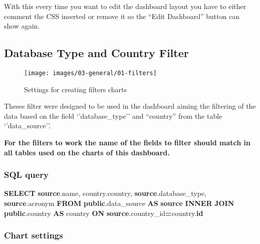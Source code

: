 \documentclass[
]{book}
\newenvironment{Shaded}{\begin{snugshade}}{\end{snugshade}}
\newcommand{\KeywordTok}[1]{\textcolor[rgb]{0.13,0.29,0.53}{\textbf{#1}}}
\newcommand{\NormalTok}[1]{#1}
\newcommand{\OperatorTok}[1]{\textcolor[rgb]{0.81,0.36,0.00}{\textbf{#1}}}
\begin{document}
With this every time you want to edit the dashboard layout you have to either comment the CSS inserted
or remove it so the ``Edit Dashboard'' button can show again.

\hypertarget{database-type-and-country-filter}{%
\subsection*{Database Type and Country Filter}\label{database-type-and-country-filter}}

\begin{figure}
\texttt{[image: images/03-general/01-filters]} \caption{Settings for creating filters charts}\label{fig:filters}
\end{figure}

Theses filter were designed to be used in the dashboard aiming the filtering of the data based on the field `'database\_type'' and ``country'' from the table `'data\_source''.

\textbf{For the filters to work the name of the fields to filter should match in all tables used on the charts of this dashboard.}

\hypertarget{sql-query}{%
\subsubsection*{SQL query}\label{sql-query}}

\begin{Shaded}
\begin{Highlighting}[]
\KeywordTok{SELECT} \KeywordTok{source}\NormalTok{.name,}
\NormalTok{       country.country,}
       \KeywordTok{source}\NormalTok{.database\_type,}
       \KeywordTok{source}\NormalTok{.acronym}
\KeywordTok{FROM} \KeywordTok{public}\NormalTok{.data\_source }\KeywordTok{AS} \KeywordTok{source}
\KeywordTok{INNER} \KeywordTok{JOIN} \KeywordTok{public}\NormalTok{.country }\KeywordTok{AS}\NormalTok{ country}
  \KeywordTok{ON} \KeywordTok{source}\NormalTok{.country\_id}\OperatorTok{=}\NormalTok{country.}\KeywordTok{id}
\end{Highlighting}
\end{Shaded}

\hypertarget{chart-settings}{%
\subsubsection*{Chart settings}\label{chart-settings}}
\end{document}
